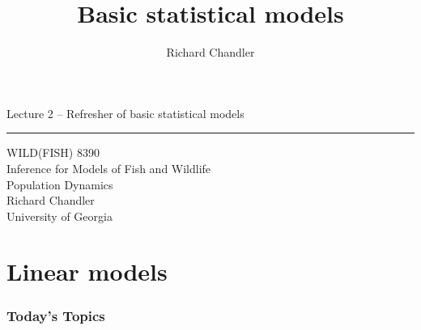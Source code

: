 \documentclass[color=usenames,dvipsnames]{beamer}\usepackage[]{graphicx}\usepackage[]{color}
\title{Basic statistical models}
\author{Richard Chandler}
\begin{document}



\begin{frame}[plain]
  \LARGE
  \centering
  {\huge Lecture 2 -- Refresher of basic statistical models} \\
  {\color{default} \rule{\textwidth}{0.1pt}}
  \vfill
  \large
  WILD(FISH) 8390 \\
  Inference for Models of Fish and Wildlife \\ Population Dynamics \\
  \vfill
  \large
  Richard Chandler \\
  University of Georgia \\
\end{frame}




\section{Linear models}


\begin{frame}[plain]
  \frametitle{Today's Topics}
  \Large
\end{frame}
\end{document}
